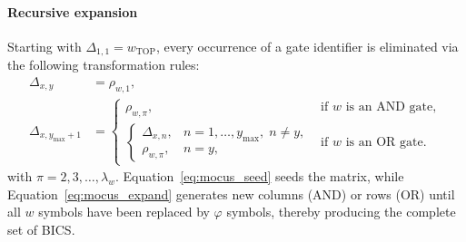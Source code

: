 \paragraph{Recursive expansion}
Starting with $\Delta_{1,1}=w_{\text{TOP}}$, every occurrence of a gate identifier is eliminated via the following transformation rules:
\begin{align}
  \Delta_{x,y}     &= \rho_{w,1}, \label{eq:mocus_seed} \\
  \Delta_{x,y_{\max}+1} &=
    \begin{cases}
      \rho_{w,\pi}, & \text{if } w \text{ is an AND gate},\\[4pt]
      \begin{cases}
        \Delta_{x,n}, & n=1,\dots,y_{\max},\; n\neq y,\\
        \rho_{w,\pi}, & n = y,
      \end{cases} & \text{if } w \text{ is an OR gate}.
    \end{cases}\label{eq:mocus_expand}
\end{align}
with $\pi=2,3,\dots,\lambda_w$.  
Equation~\eqref{eq:mocus_seed} seeds the matrix, while Equation~\eqref{eq:mocus_expand} generates new columns (AND) or rows (OR) until all $w$ symbols have been replaced by $\varphi$ symbols, thereby producing the complete set of BICS.
